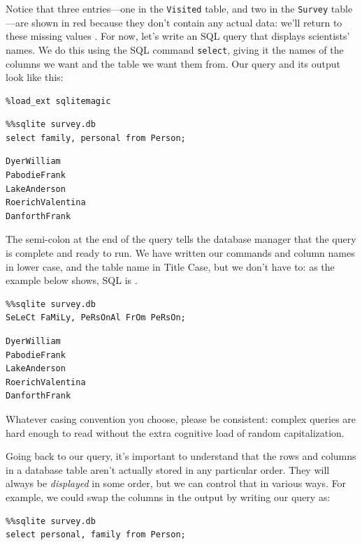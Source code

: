 \documentclass{book}
\begin{document}
Notice that three entries---one in the \texttt{Visited} table, and two
in the \texttt{Survey} table---are shown in red because they don't
contain any actual data: we'll return to these missing values
. For now, let's write an SQL query that
displays scientists' names. We do this using the SQL command
\texttt{select}, giving it the names of the columns we want and the
table we want them from. Our query and its output look like this:

\begin{verbatim}
%load_ext sqlitemagic
\end{verbatim}

\begin{verbatim}
%%sqlite survey.db
select family, personal from Person;
\end{verbatim}

\begin{verbatim}
DyerWilliam
PabodieFrank
LakeAnderson
RoerichValentina
DanforthFrank
\end{verbatim}

The semi-colon at the end of the query tells the database manager that
the query is complete and ready to run. We have written our commands and
column names in lower case, and the table name in Title Case, but we
don't have to: as the example below shows, SQL is
.

\begin{verbatim}
%%sqlite survey.db
SeLeCt FaMiLy, PeRsOnAl FrOm PeRsOn;
\end{verbatim}

\begin{verbatim}
DyerWilliam
PabodieFrank
LakeAnderson
RoerichValentina
DanforthFrank
\end{verbatim}

Whatever casing convention you choose, please be consistent: complex
queries are hard enough to read without the extra cognitive load of
random capitalization.

Going back to our query, it's important to understand that the rows and
columns in a database table aren't actually stored in any particular
order. They will always be \emph{displayed} in some order, but we can
control that in various ways. For example, we could swap the columns in
the output by writing our query as:

\begin{verbatim}
%%sqlite survey.db
select personal, family from Person;
\end{verbatim}
\end{document}
